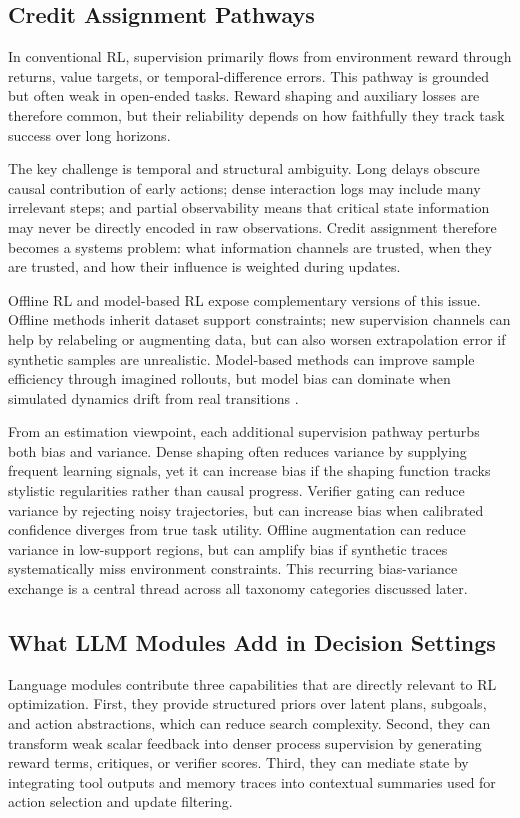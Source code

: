 \documentclass[pdflatex,sn-mathphys-num]{sn-jnl}
\begin{document}
\subsection{Credit Assignment Pathways}
In conventional RL, supervision primarily flows from environment reward through returns, value targets, or temporal-difference errors. This pathway is grounded but often weak in open-ended tasks. Reward shaping and auxiliary losses are therefore common, but their reliability depends on how faithfully they track task success over long horizons.

The key challenge is temporal and structural ambiguity. Long delays obscure causal contribution of early actions; dense interaction logs may include many irrelevant steps; and partial observability means that critical state information may never be directly encoded in raw observations. Credit assignment therefore becomes a systems problem: what information channels are trusted, when they are trusted, and how their influence is weighted during updates.

Offline RL and model-based RL expose complementary versions of this issue. Offline methods inherit dataset support constraints; new supervision channels can help by relabeling or augmenting data, but can also worsen extrapolation error if synthetic samples are unrealistic. Model-based methods can improve sample efficiency through imagined rollouts, but model bias can dominate when simulated dynamics drift from real transitions \cite{arxiv_p_2301_12050,arxiv_p_2602_02454,arxiv_p_2602_11075,arxiv_p_2602_00785}.

From an estimation viewpoint, each additional supervision pathway perturbs both bias and variance. Dense shaping often reduces variance by supplying frequent learning signals, yet it can increase bias if the shaping function tracks stylistic regularities rather than causal progress. Verifier gating can reduce variance by rejecting noisy trajectories, but can increase bias when calibrated confidence diverges from true task utility. Offline augmentation can reduce variance in low-support regions, but can amplify bias if synthetic traces systematically miss environment constraints. This recurring bias-variance exchange is a central thread across all taxonomy categories discussed later.

\subsection{What LLM Modules Add in Decision Settings}
Language modules contribute three capabilities that are directly relevant to RL optimization. First, they provide structured priors over latent plans, subgoals, and action abstractions, which can reduce search complexity. Second, they can transform weak scalar feedback into denser process supervision by generating reward terms, critiques, or verifier scores. Third, they can mediate state by integrating tool outputs and memory traces into contextual summaries used for action selection and update filtering.
\end{document}
